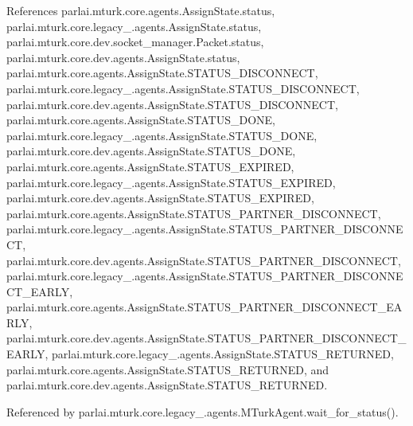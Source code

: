 References parlai.\+mturk.\+core.\+agents.\+Assign\+State.\+status, parlai.\+mturk.\+core.\+legacy\+\_.\+agents.\+Assign\+State.\+status, parlai.\+mturk.\+core.\+dev.\+socket\+\_\+manager.\+Packet.\+status, parlai.\+mturk.\+core.\+dev.\+agents.\+Assign\+State.\+status, parlai.\+mturk.\+core.\+agents.\+Assign\+State.\+S\+T\+A\+T\+U\+S\+\_\+\+D\+I\+S\+C\+O\+N\+N\+E\+CT, parlai.\+mturk.\+core.\+legacy\+\_.\+agents.\+Assign\+State.\+S\+T\+A\+T\+U\+S\+\_\+\+D\+I\+S\+C\+O\+N\+N\+E\+CT, parlai.\+mturk.\+core.\+dev.\+agents.\+Assign\+State.\+S\+T\+A\+T\+U\+S\+\_\+\+D\+I\+S\+C\+O\+N\+N\+E\+CT, parlai.\+mturk.\+core.\+agents.\+Assign\+State.\+S\+T\+A\+T\+U\+S\+\_\+\+D\+O\+NE, parlai.\+mturk.\+core.\+legacy\+\_.\+agents.\+Assign\+State.\+S\+T\+A\+T\+U\+S\+\_\+\+D\+O\+NE, parlai.\+mturk.\+core.\+dev.\+agents.\+Assign\+State.\+S\+T\+A\+T\+U\+S\+\_\+\+D\+O\+NE, parlai.\+mturk.\+core.\+agents.\+Assign\+State.\+S\+T\+A\+T\+U\+S\+\_\+\+E\+X\+P\+I\+R\+ED, parlai.\+mturk.\+core.\+legacy\+\_.\+agents.\+Assign\+State.\+S\+T\+A\+T\+U\+S\+\_\+\+E\+X\+P\+I\+R\+ED, parlai.\+mturk.\+core.\+dev.\+agents.\+Assign\+State.\+S\+T\+A\+T\+U\+S\+\_\+\+E\+X\+P\+I\+R\+ED, parlai.\+mturk.\+core.\+agents.\+Assign\+State.\+S\+T\+A\+T\+U\+S\+\_\+\+P\+A\+R\+T\+N\+E\+R\+\_\+\+D\+I\+S\+C\+O\+N\+N\+E\+CT, parlai.\+mturk.\+core.\+legacy\+\_.\+agents.\+Assign\+State.\+S\+T\+A\+T\+U\+S\+\_\+\+P\+A\+R\+T\+N\+E\+R\+\_\+\+D\+I\+S\+C\+O\+N\+N\+E\+CT, parlai.\+mturk.\+core.\+dev.\+agents.\+Assign\+State.\+S\+T\+A\+T\+U\+S\+\_\+\+P\+A\+R\+T\+N\+E\+R\+\_\+\+D\+I\+S\+C\+O\+N\+N\+E\+CT, parlai.\+mturk.\+core.\+legacy\+\_.\+agents.\+Assign\+State.\+S\+T\+A\+T\+U\+S\+\_\+\+P\+A\+R\+T\+N\+E\+R\+\_\+\+D\+I\+S\+C\+O\+N\+N\+E\+C\+T\+\_\+\+E\+A\+R\+LY, parlai.\+mturk.\+core.\+agents.\+Assign\+State.\+S\+T\+A\+T\+U\+S\+\_\+\+P\+A\+R\+T\+N\+E\+R\+\_\+\+D\+I\+S\+C\+O\+N\+N\+E\+C\+T\+\_\+\+E\+A\+R\+LY, parlai.\+mturk.\+core.\+dev.\+agents.\+Assign\+State.\+S\+T\+A\+T\+U\+S\+\_\+\+P\+A\+R\+T\+N\+E\+R\+\_\+\+D\+I\+S\+C\+O\+N\+N\+E\+C\+T\+\_\+\+E\+A\+R\+LY, parlai.\+mturk.\+core.\+legacy\+\_.\+agents.\+Assign\+State.\+S\+T\+A\+T\+U\+S\+\_\+\+R\+E\+T\+U\+R\+N\+ED, parlai.\+mturk.\+core.\+agents.\+Assign\+State.\+S\+T\+A\+T\+U\+S\+\_\+\+R\+E\+T\+U\+R\+N\+ED, and parlai.\+mturk.\+core.\+dev.\+agents.\+Assign\+State.\+S\+T\+A\+T\+U\+S\+\_\+\+R\+E\+T\+U\+R\+N\+ED.



Referenced by parlai.\+mturk.\+core.\+legacy\+\_.\+agents.\+M\+Turk\+Agent.\+wait\+\_\+for\+\_\+status().

